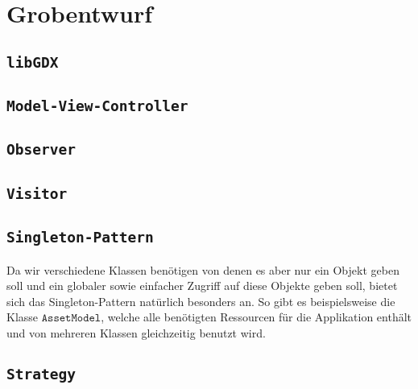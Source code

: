 \section{Grobentwurf}

\subsection{\texttt{libGDX}}

\subsection{\texttt{Model-View-Controller}}

\subsection{\texttt{Observer}}

\subsection{\texttt{Visitor}}

\subsection{\texttt{Singleton-Pattern}}
Da wir verschiedene Klassen benötigen von denen es aber nur ein Objekt geben soll und ein globaler sowie einfacher Zugriff auf diese Objekte geben soll, bietet sich das Singleton-Pattern natürlich besonders an. So gibt es beispielsweise die Klasse $\texttt{AssetModel}$, welche alle benötigten Ressourcen für die Applikation enthält und von mehreren Klassen gleichzeitig benutzt wird.


\subsection{\texttt{Strategy}}
